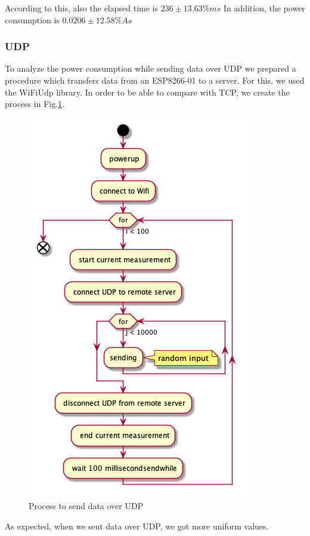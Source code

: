 According to this, also the elapsed time is $236 \pm 13.63\% ms$
In addition, the power consumption is $0.0206 \pm 12.58\% As$


\subsubsection{UDP}
To analyze the power consumption while sending data over UDP we prepared a procedure which
transfers data from an ESP8266-01 to a server. For this, we used the WiFiUdp library.
In order to be able to compare with TCP, we create the process in Fig.\ref{fig:udp_uml}.

\begin{figure}[h]
    \centering
    \includegraphics[width = 0.6 \linewidth]{fig/udp_tcp/udp_uml.png}
    \caption{Process to send data over UDP}
    \label{fig:udp_uml}
\end{figure}
As expected, when we sent data over UDP, we got more uniform values.

